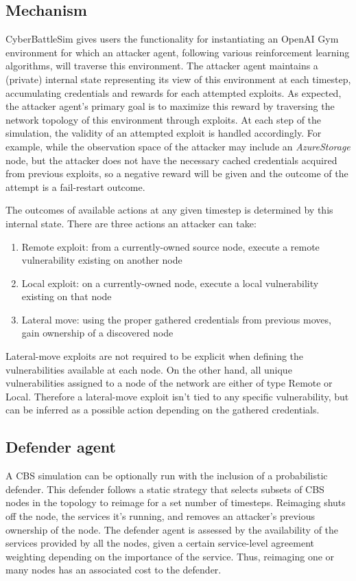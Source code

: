 \subsection{Mechanism}
CyberBattleSim gives users the functionality for instantiating an OpenAI Gym environment for which an attacker agent, following various reinforcement learning algorithms, will traverse this environment. The attacker agent maintains a (private) internal state representing its view of this environment at each timestep, accumulating credentials and rewards for each attempted exploits. As expected, the attacker agent's primary goal is to maximize this reward by traversing the network topology of this environment through exploits. At each step of the simulation, the validity of an attempted exploit is handled accordingly. For example, while the observation space of the attacker may include an \textit{AzureStorage} node, but the attacker does not have the necessary cached credentials acquired from previous exploits, so a negative reward will be given and the outcome of the attempt is a fail-restart outcome.

The outcomes of available actions at any given timestep is determined by this internal state. There are three actions an attacker can take:
\begin{enumerate}
    \item Remote exploit: from a currently-owned source node, execute a remote vulnerability existing on another node
    \item Local exploit: on a currently-owned node, execute a local vulnerability existing on that node
    \item Lateral move: using the proper gathered credentials from previous moves, gain ownership of a discovered node
\end{enumerate}

Lateral-move exploits are not required to be explicit when defining the vulnerabilities available at each node. On the other hand, all unique vulnerabilities assigned to a node of the network are either of type Remote or Local. Therefore a lateral-move exploit isn't tied to any specific vulnerability, but can be inferred as a possible action depending on the gathered credentials.

\subsection{Defender agent}
A CBS simulation can be optionally run with the inclusion of a probabilistic defender. This defender follows a static strategy that selects subsets of CBS nodes in the topology to reimage for a set number of timesteps. Reimaging shuts off the node, the services it's running, and removes an attacker's previous ownership of the node. The defender agent is assessed by the availability of the services provided by all the nodes, given a certain service-level agreement weighting depending on the importance of the service. Thus, reimaging one or many nodes has an associated cost to the defender.

